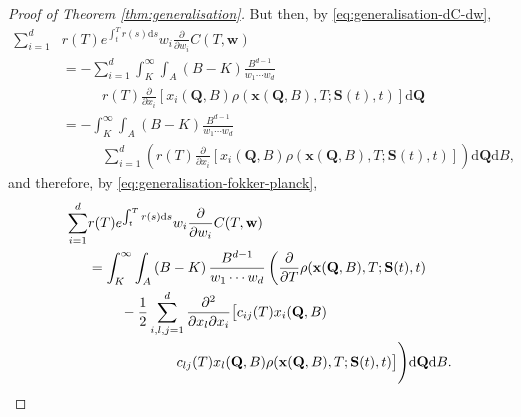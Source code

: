 \documentclass[english]{article}
\numberwithin{equation}{section}
\numberwithin{figure}{section}
\theoremstyle{bolddescit}
\theoremstyle{definition}
\theoremstyle{definition}
\theoremstyle{plain}
\theoremstyle{plain}
\theoremstyle{bolddesc}
\theoremstyle{plain}
\theoremstyle{remark}
\begin{document}
\begin{proof}[Proof of Theorem \ref{thm:generalisation}]
  But then, by \eqref{eq:generalisation-dC-dw},
  \begin{align*}
    \sum_{i=1}^{d} &r(T) e^{\int_t^T r(s) \mathrm{d}s} w_i \frac{\partial}{\partial w_i} C(T,\mathbf{w})\\
    &= - \sum_{i=1}^{d} \int_K^\infty \int_A \left(B - K\right) \frac{B^{d-1}}{w_1 \cdots w_d}\\
        &\ \ \ \ \ \ \ \ \ \ \ \ \  r(T)\frac{\partial}{\partial x_i}\left[x_i(\mathbf{Q},B) \rho(\mathbf{x}(\mathbf{Q},B),T;\mathbf{S}(t),t) \right] \mathrm{d}\mathbf{Q} \\
    &= - \int_K^\infty \int_A \left(B - K\right) \frac{B^{d-1}}{w_1 \cdots w_d}\\
        &\ \ \ \ \ \ \ \ \ \ \ \ \ \sum_{i=1}^{d} \left( r(T)\frac{\partial}{\partial x_i}\left[x_i(\mathbf{Q},B) \rho(\mathbf{x}(\mathbf{Q},B),T;\mathbf{S}(t),t) \right] \right) \mathrm{d}\mathbf{Q} \mathrm{d}B,
  \end{align*}
  and therefore, by \eqref{eq:generalisation-fokker-planck},
  \begin{align}
    \sum_{i=1}^{d} &r(T) e^{\int_t^T r(s) \mathrm{d}s} w_i \frac{\partial}{\partial w_i} C(T,\mathbf{w})\notag\\
    &= \int_K^\infty \int_A \left(B - K\right) \frac{B^{d-1}}{w_1 \cdots w_d}
      \left( \frac{\partial}{\partial T}\rho(\mathbf{x}(\mathbf{Q},B),T;\mathbf{S}(t),t)\right.\notag\\
      &\ \ \ \ \ \ \ - \frac{1}{2} \sum_{i,l,j=1}^{d} \frac{\partial^2}{\partial x_l \partial x_i}\big[c_{ij}(T) x_i(\mathbf{Q},B) \notag\\
      &\ \ \ \ \ \ \ \ \ \ \ \ \ \ \ \ \ \ \ c_{lj}(T) x_l(\mathbf{Q},B) \rho(\mathbf{x}(\mathbf{Q},B),T;\mathbf{S}(t),t)\big] \Bigg) \mathrm{d}\mathbf{Q} \mathrm{d}B. \label{eq:generalisation-one-deriv}
  \end{align}


\end{proof}
\end{document}
